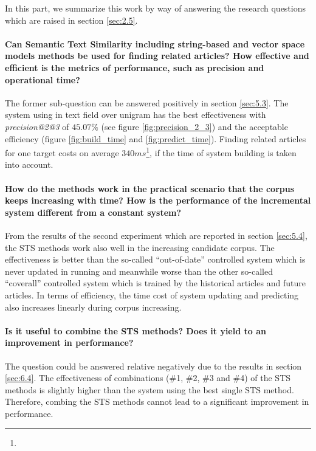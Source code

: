In this part, we summarize this work by way of answering the research questions which are raised in section \ref{sec:2.5}. 

\paragraph{Can Semantic Text Similarity including string-based and vector space models methods be used for finding related articles? How effective and efficient is the metrics of performance, such as precision and operational time?}

The former sub-question can be answered positively in section \ref{sec:5.3}. The system using \tfidf{} in text field \icontent{} over unigram has the best effectiveness with \textit{precision@2@3} of $45.07\%$ (see figure \ref{fig:precision_2_3}) and the acceptable efficiency (figure \ref{fig:build_time} and \ref{fig:predict_time}). Finding related articles for one target costs on average $340ms$\footnote{}, if the time of system building is taken into account.  

\paragraph{How do the methods work in the practical scenario that the corpus keeps increasing with time? How is the performance of the incremental system different from a constant system? }

From the results of the second experiment which are reported in section \ref{sec:5.4}, the STS methods work also well in the increasing candidate corpus. The effectiveness is better than the so-called ``out-of-date'' controlled system which is never updated in running and meanwhile worse than the other so-called ``coverall'' controlled system which is trained by the historical articles and future articles. In terms of efficiency, the time cost of system updating and predicting also increases linearly during corpus increasing. 


\paragraph{Is it useful to combine the STS methods? Does it yield to an improvement in performance?}

The question could be answered relative negatively due to the results in section \ref{sec:6.4}. The effectiveness of combinations (\#1, \#2, \#3 and \#4) of the STS methods is slightly higher than the system using the best single STS method. Therefore, combing the STS methods cannot lead to a significant improvement in performance. 

